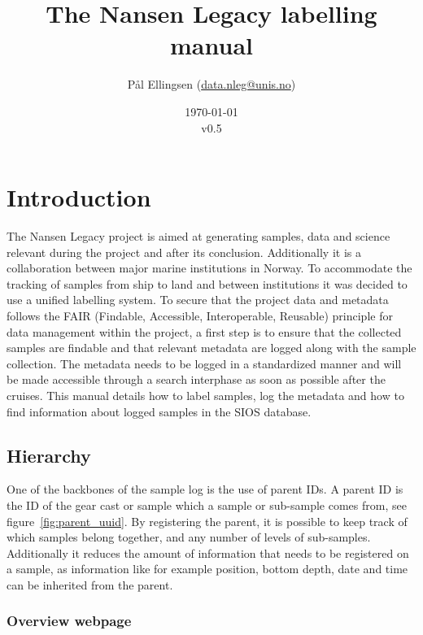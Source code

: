 \documentclass[a4paper,english, 11pt]{article}
\title{The Nansen Legacy labelling manual}
\date{\today\\v0.5}
\author{Pål Ellingsen (\url{data.nleg@unis.no})}
\begin{document}
\maketitle
\tableofcontents
\pagestyle{fancy}
\newpage
\section{Introduction} %
\label{sec:Introduction}

The Nansen Legacy project is aimed at generating samples, data and science relevant during the project and after its conclusion. Additionally it is a collaboration between major marine institutions in Norway. To accommodate the tracking of samples from ship to land and between institutions it was decided to use a unified labelling system. To secure that the project data and metadata follows the FAIR (Findable, Accessible, Interoperable, Reusable) principle for data management within the project, a first step is to ensure that the collected samples are findable and that relevant metadata are logged
along with the sample collection. The metadata needs to be logged in a standardized manner and will be
made accessible through a search interphase as soon as possible after the cruises.  This manual details how to label samples, log the metadata and how to find information about logged samples in the SIOS database.  



\subsection{Hierarchy} %
\label{sub:Hirarcy}

One of the backbones of the sample log is the use of parent IDs. A parent ID is the ID of the gear cast or sample which a sample or sub-sample comes from, see figure~\ref{fig:parent_uuid}. By registering the parent, it is possible to keep track of which samples belong together, and any number of levels of sub-samples. Additionally it reduces the amount of information that needs to be registered on a sample, as information like for example position, bottom depth, date and time can be inherited from the parent. 

\subsubsection{Overview webpage} %
\label{ssub:Overview_webpage}
\end{document}
